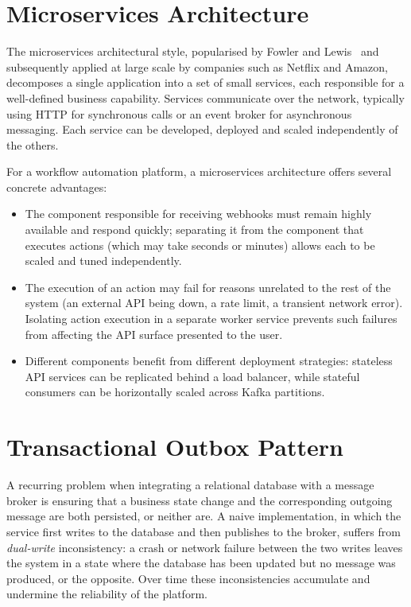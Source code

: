 \section{Microservices Architecture}

The microservices architectural style, popularised by Fowler and Lewis~\cite{fowler2014microservices} and subsequently applied at large scale by companies such as Netflix and Amazon, decomposes a single application into a set of small services, each responsible for a well-defined business capability. Services communicate over the network, typically using HTTP for synchronous calls or an event broker for asynchronous messaging. Each service can be developed, deployed and scaled independently of the others.

For a workflow automation platform, a microservices architecture offers several concrete advantages:

\begin{itemize}
\item The component responsible for receiving webhooks must remain highly available and respond quickly; separating it from the component that executes actions (which may take seconds or minutes) allows each to be scaled and tuned independently.
\item The execution of an action may fail for reasons unrelated to the rest of the system (an external API being down, a rate limit, a transient network error). Isolating action execution in a separate worker service prevents such failures from affecting the API surface presented to the user.
\item Different components benefit from different deployment strategies: stateless API services can be replicated behind a load balancer, while stateful consumers can be horizontally scaled across Kafka partitions.
\end{itemize}

\section{Transactional Outbox Pattern}

A recurring problem when integrating a relational database with a message broker is ensuring that a business state change and the corresponding outgoing message are both persisted, or neither are. A naive implementation, in which the service first writes to the database and then publishes to the broker, suffers from \emph{dual-write} inconsistency: a crash or network failure between the two writes leaves the system in a state where the database has been updated but no message was produced, or the opposite. Over time these inconsistencies accumulate and undermine the reliability of the platform.

